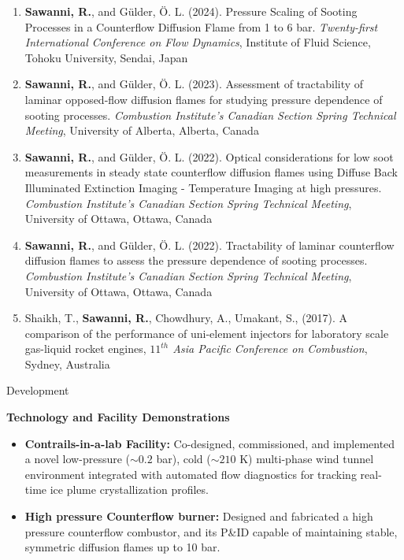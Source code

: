 \documentclass[11pt,a4paper]{article}
\begin{document}
\begin{enumerate}
		\item {\textbf{Sawanni, R.}, and G\"{u}lder, \"{O}. L. (2024). Pressure Scaling of Sooting Processes in a Counterflow Diffusion Flame from 1 to 6 bar. \emph{Twenty-first International Conference on Flow Dynamics}, Institute of Fluid Science, Tohoku University, Sendai, Japan}
		\item {\textbf{Sawanni, R.}, and G\"{u}lder, \"{O}. L. (2023). Assessment of tractability of laminar opposed-flow diffusion flames for studying pressure dependence of sooting processes. \emph{Combustion Institute's Canadian Section Spring Technical Meeting}, University of Alberta, Alberta, Canada}
		\item {\textbf{Sawanni, R.}, and G\"{u}lder, \"{O}. L. (2022). Optical considerations for low soot measurements in steady state counterflow diffusion flames using Diffuse Back Illuminated Extinction Imaging - Temperature Imaging at high pressures. \emph{Combustion Institute's Canadian Section Spring Technical Meeting}, University of Ottawa, Ottawa, Canada}
		\item {\textbf{Sawanni, R.}, and G\"{u}lder, \"{O}. L. (2022). Tractability of laminar counterflow diffusion flames to assess the pressure dependence of sooting processes. \emph{Combustion Institute's Canadian Section Spring Technical Meeting}, University of Ottawa, Ottawa, Canada}
		\item {Shaikh, T., \textbf{Sawanni, R.}, Chowdhury, A., Umakant, S., (2017). A comparison of the performance of uni-element injectors for laboratory scale gas-liquid rocket engines, \emph{$11^{th}$ Asia Pacific Conference on Combustion}, Sydney, Australia}
	\end{enumerate}
	


\begin{sectionbanner}{Development}
\end{sectionbanner}
\noindent\textbf{Technology and Facility Demonstrations}
	\begin{itemize}
		\item \textbf{Contrails-in-a-lab Facility:} Co-designed, commissioned, and implemented a novel low-pressure ($\sim 0.2$ bar), cold ($\sim 210$ K) multi-phase wind tunnel environment integrated with automated flow diagnostics for tracking real-time ice plume crystallization profiles.
		\item \textbf{High pressure Counterflow burner:} Designed and fabricated a high pressure counterflow combustor, and its P\&ID capable of maintaining stable, symmetric diffusion flames up to 10 bar. 
	\end{itemize}
\end{document}
